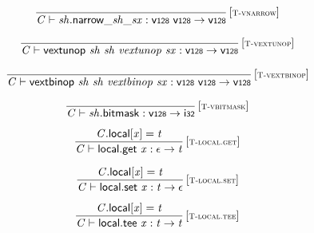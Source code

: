$$
\begin{array}{@{}c@{}}\displaystyle
\frac{
}{
{\mathit{C}} \vdash {{{{{\mathit{sh}}.\mathsf{narrow}}{\mathsf{\_}}}{{\mathit{sh}}}}{\mathsf{\_}}}{{\mathit{sx}}} : \mathsf{v{\scriptstyle128}}~\mathsf{v{\scriptstyle128}} \rightarrow \mathsf{v{\scriptstyle128}}
} \, {[\textsc{\scriptsize T{-}vnarrow}]}
\qquad
\end{array}
$$

$$
\begin{array}{@{}c@{}}\displaystyle
\frac{
}{
{\mathit{C}} \vdash \mathsf{vextunop}~{\mathit{sh}}~{\mathit{sh}}~{\mathit{vextunop}}~{\mathit{sx}} : \mathsf{v{\scriptstyle128}} \rightarrow \mathsf{v{\scriptstyle128}}
} \, {[\textsc{\scriptsize T{-}vextunop}]}
\qquad
\end{array}
$$

$$
\begin{array}{@{}c@{}}\displaystyle
\frac{
}{
{\mathit{C}} \vdash \mathsf{vextbinop}~{\mathit{sh}}~{\mathit{sh}}~{\mathit{vextbinop}}~{\mathit{sx}} : \mathsf{v{\scriptstyle128}}~\mathsf{v{\scriptstyle128}} \rightarrow \mathsf{v{\scriptstyle128}}
} \, {[\textsc{\scriptsize T{-}vextbinop}]}
\qquad
\end{array}
$$

$$
\begin{array}{@{}c@{}}\displaystyle
\frac{
}{
{\mathit{C}} \vdash {\mathit{sh}}.\mathsf{bitmask} : \mathsf{v{\scriptstyle128}} \rightarrow \mathsf{i{\scriptstyle32}}
} \, {[\textsc{\scriptsize T{-}vbitmask}]}
\qquad
\end{array}
$$

\vspace{1ex}

$$
\begin{array}{@{}c@{}}\displaystyle
\frac{
{\mathit{C}}.\mathsf{local}{}[{\mathit{x}}] = {\mathit{t}}
}{
{\mathit{C}} \vdash \mathsf{local.get}~{\mathit{x}} : \epsilon \rightarrow {\mathit{t}}
} \, {[\textsc{\scriptsize T{-}local.get}]}
\qquad
\end{array}
$$

$$
\begin{array}{@{}c@{}}\displaystyle
\frac{
{\mathit{C}}.\mathsf{local}{}[{\mathit{x}}] = {\mathit{t}}
}{
{\mathit{C}} \vdash \mathsf{local.set}~{\mathit{x}} : {\mathit{t}} \rightarrow \epsilon
} \, {[\textsc{\scriptsize T{-}local.set}]}
\qquad
\end{array}
$$

$$
\begin{array}{@{}c@{}}\displaystyle
\frac{
{\mathit{C}}.\mathsf{local}{}[{\mathit{x}}] = {\mathit{t}}
}{
{\mathit{C}} \vdash \mathsf{local.tee}~{\mathit{x}} : {\mathit{t}} \rightarrow {\mathit{t}}
} \, {[\textsc{\scriptsize T{-}local.tee}]}
\qquad
\end{array}
$$


